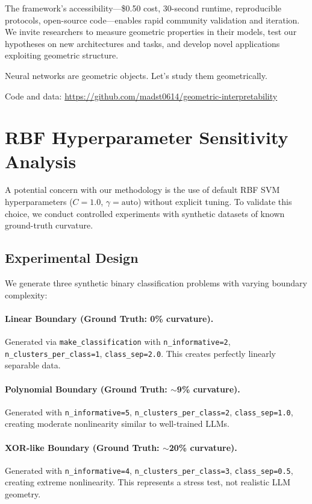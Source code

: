 \documentclass[11pt]{article}
\begin{document}
The framework's accessibility---\$0.50 cost, 30-second runtime, reproducible protocols, open-source code---enables rapid community validation and iteration. We invite researchers to measure geometric properties in their models, test our hypotheses on new architectures and tasks, and develop novel applications exploiting geometric structure.

Neural networks are geometric objects. Let's study them geometrically.

\noindent Code and data: \url{https://github.com/madst0614/geometric-interpretability}

\appendix

\section{RBF Hyperparameter Sensitivity Analysis}
\label{appendix:rbf_sensitivity}

A potential concern with our methodology is the use of default RBF SVM hyperparameters ($C=1.0$, $\gamma=\text{auto}$) without explicit tuning. To validate this choice, we conduct controlled experiments with synthetic datasets of known ground-truth curvature.

\subsection{Experimental Design}

We generate three synthetic binary classification problems with varying boundary complexity:

\paragraph{Linear Boundary (Ground Truth: 0\% curvature).}
Generated via \texttt{make\_classification} with \texttt{n\_informative=2}, \texttt{n\_clusters\_per\_class=1}, \texttt{class\_sep=2.0}. This creates perfectly linearly separable data.

\paragraph{Polynomial Boundary (Ground Truth: $\sim$9\% curvature).}
Generated with \texttt{n\_informative=5}, \texttt{n\_clusters\_per\_class=2}, \texttt{class\_sep=1.0}, creating moderate nonlinearity similar to well-trained LLMs.

\paragraph{XOR-like Boundary (Ground Truth: $\sim$20\% curvature).}
Generated with \texttt{n\_informative=4}, \texttt{n\_clusters\_per\_class=3}, \texttt{class\_sep=0.5}, creating extreme nonlinearity. This represents a stress test, not realistic LLM geometry.
\end{document}
